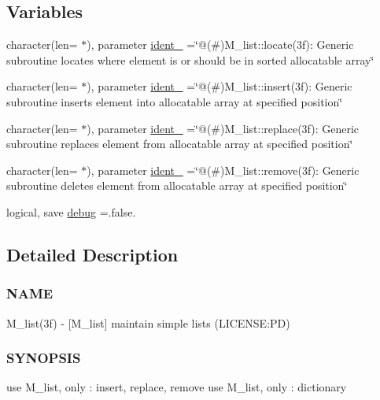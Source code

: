 \subsection*{Variables}
\begin{DoxyCompactItemize}
\item 
character(len= $\ast$), parameter \mbox{\hyperlink{namespacem__list_a5b8d48a0fc3218e8ed1d263a73748a27}{ident\+\_}} =\char`\"{}@(\#)M\+\_\+list\+::locate(3f)\+: Generic subroutine locates where element is or should be in sorted allocatable array\char`\"{}
\item 
character(len= $\ast$), parameter \mbox{\hyperlink{namespacem__list_a25c880ddb1248291f9b143e99fd80870}{ident\+\_}} =\char`\"{}@(\#)M\+\_\+list\+::insert(3f)\+: Generic subroutine inserts element into allocatable array at specified position\char`\"{}
\item 
character(len= $\ast$), parameter \mbox{\hyperlink{namespacem__list_a47ce2be826f94ee09c3b15b367504866}{ident\+\_}} =\char`\"{}@(\#)M\+\_\+list\+::replace(3f)\+: Generic subroutine replaces element from allocatable array at specified position\char`\"{}
\item 
character(len= $\ast$), parameter \mbox{\hyperlink{namespacem__list_a9ff7bfbdf866c8a3a9fc831c228ce065}{ident\+\_}} =\char`\"{}@(\#)M\+\_\+list\+::remove(3f)\+: Generic subroutine deletes element from allocatable array at specified position\char`\"{}
\item 
logical, save \mbox{\hyperlink{namespacem__list_aaa3ea916cd8c669ebbc8ec9096c5bbca}{debug}} =.false.
\end{DoxyCompactItemize}


\subsection{Detailed Description}
\subsubsection*{N\+A\+ME}

M\+\_\+list(3f) -\/ \mbox{[}M\+\_\+list\mbox{]} maintain simple lists (L\+I\+C\+E\+N\+SE\+:PD) 

\subsubsection*{S\+Y\+N\+O\+P\+S\+IS}

\begin{DoxyVerb}use M_list, only : insert, replace, remove
use M_list, only : dictionary
\end{DoxyVerb}



